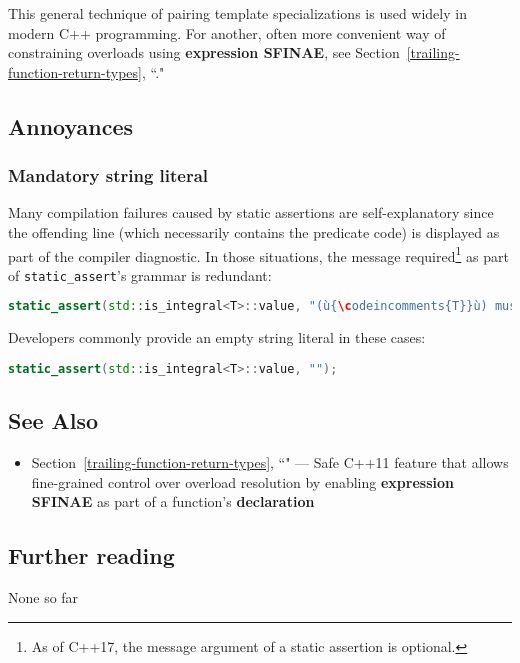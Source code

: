 \noindent This general technique of pairing template specializations is used widely
in modern C++ programming. For another, often more convenient way of
constraining overloads using \textbf{expression SFINAE}, see Section~\ref{trailing-function-return-types}, ``."

\subsection[Annoyances]{Annoyances}\label{static-annoyances}

\subsubsection[Mandatory string literal]{Mandatory string literal}\label{mandatory-string-literal}

Many compilation failures caused by static assertions are
self-explanatory since the offending line (which necessarily contains the
predicate code) is displayed as part of the compiler diagnostic. In
those situations, the message required{\cprotect\footnote{As of C++17,
  the message argument of a static assertion is optional.}} as part of
\texttt{static\_assert}'s grammar is redundant:

\begin{lstlisting}[language=C++]
static_assert(std::is_integral<T>::value, "(ù{\codeincomments{T}}ù) must be an integral type.");
\end{lstlisting}
    
\noindent Developers commonly provide an empty string literal in these
cases:

\begin{lstlisting}[language=C++]
static_assert(std::is_integral<T>::value, "");
\end{lstlisting}
    

\subsection[See Also]{See Also}\label{see-also}

\begin{itemize}
\item{Section~\ref{trailing-function-return-types}, ``" — Safe C++11 feature that allows fine-grained control over overload resolution by enabling \textbf{expression SFINAE} as part of a function’s \textbf{declaration}}
\end{itemize}

\subsection[Further reading]{Further reading}\label{further-reading}

None so far



